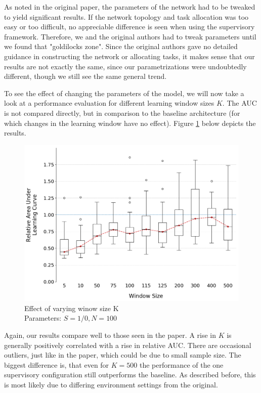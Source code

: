 \documentclass[letterpaper]{article}
\begin{document}
As noted in the original paper, the parameters of the network had to be tweaked to yield significant results.  If the network topology and task allocation was too easy or too difficult, no appreciable difference is seen when using the supervisory framework.  Therefore, we and the original authors had to tweak parameters until we found that "goldilocks zone".  Since the original authors gave no detailed guidance in constructing the network or allocating tasks, it makes sense that our results are not exactly the same, since our parametrizations were undoubtedly different, though we still see the same general trend.

To see the effect of changing the parameters of the model, we will now take a look at a performance evaluation for different learning window sizes $K$. The AUC is not compared directly, but in comparison to the baseline architecture (for which changes in the learning window have no effect). Figure \ref{fig:windows} below depicts the results.
\begin{figure}[H]
 \begin{center}
  \includegraphics[width=\linewidth]{figures/figure4_extended}
  \caption{Effect of varying winow size K\\Parameters: $S=1/0,N=100$}
  \label{fig:windows}
 \end{center}
\end{figure}

Again, our results compare well to those seen in the paper. A rise in $K$ is generally positively correlated with a rise in relative AUC. There are occasional outliers, just like in the paper, which could be due to small sample size. The biggest difference is, that even for $K=500$ the performance of the one supervisory configuration still outperforms the baseline. As described before, this is most likely due to differing environment settings from the original.
\end{document}
